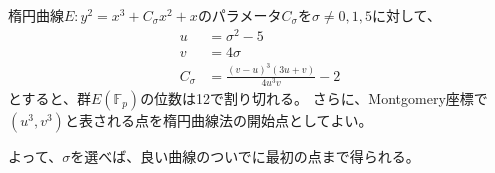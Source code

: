 \begin{Theo}{}{}
楕円曲線$E:y^2=x^3+C_{\sigma}x^2+x$のパラメータ$C_{\sigma}$を$\sigma\neq0,1,5$に対して、
\begin{align*}
u &= \sigma^2 - 5\\
v &= 4\sigma\\
C_{\sigma} &= \frac{(v - u)^3(3u+v)}{4u^3v} - 2
\end{align*}
とすると、群$E(\mathbb{F}_p)$の位数は12で割り切れる。
さらに、Montgomery座標で$(u^3,v^3)$と表される点を楕円曲線法の開始点としてよい。
\end{Theo}

よって、$\sigma$を選べば、良い曲線のついでに最初の点まで得られる。



